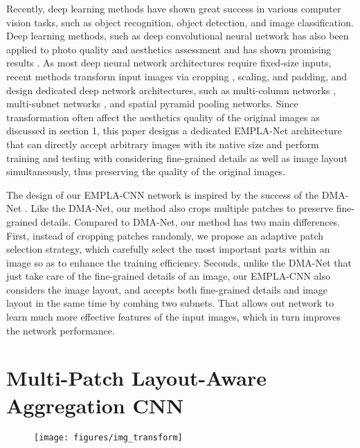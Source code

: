 \documentclass[10pt,twocolumn,letterpaper]{article}
\begin{document}
Recently, deep learning methods have shown great success in various 
computer vision tasks, such as object recognition, object detection, 
and image classification. Deep learning methods, such as deep 
convolutional neural network has also been applied to photo quality and 
aesthetics assessment and has shown promising results \cite{Lu:2014:ACMMM}
\cite{Lu:2015:ICCV} \cite{Tang:2014:CVPR}. As most deep neural network 
architectures require fixed-size inputs, recent methods transform input images
via cropping \cite{Kang:2014:CVPR}, scaling, and padding, 
and design dedicated deep network architectures, 
such as multi-column networks \cite{Lu:2014:ACMMM} \cite{Lu:2015:ICCV}, 
multi-subnet networks \cite{Mai:2016:CVPR}, and spatial pyramid pooling 
networks\cite{Kaiming:archive:2014}. Since transformation often affect the 
aesthetics quality of the original images as discussed in section 1, this 
paper designs a dedicated EMPLA-Net architecture that can directly accept 
arbitrary images with its native size and perform training and testing 
with considering fine-grained details as well as image layout simultaneously, 
thus preserving the quality of the original images.

The design of our EMPLA-CNN network is inspired by the success of the 
DMA-Net \cite{Lu:2015:ICCV}. Like the DMA-Net, our method also crops 
multiple patches to preserve fine-grained details. Compared to DMA-Net, 
our method has two main differences. First, instead of cropping patches
randomly, we propose an adaptive patch selection strategy, which carefully
select the most important parts within an image so as to enhance the training 
efficiency. Seconds, unlike the DMA-Net that just take care of the fine-grained 
details of an image, our EMPLA-CNN also considers the image layout, and accepts 
both fine-grained details and image layout in the same time by combing two subnets.
That allows out network to learn much more effective features of the input images, 
which in turn improves the network performance.

\section{Multi-Patch Layout-Aware Aggregation CNN}

\begin{figure}
	\centering
	\texttt{[image: figures/img\_transform]}
	\label{transform}
\end{figure}
\end{document}

